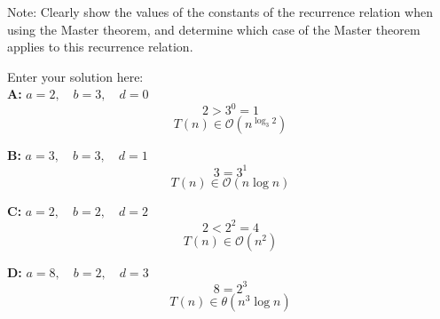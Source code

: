 \documentclass[10pt]{exam}
\begin{document}
\begin{questions}
Note: Clearly show the values of the constants of the recurrence relation when using the Master theorem, and determine which case of the Master theorem applies to this recurrence relation.


\begin{solution}
    Enter your solution here:\\
    \textbf{A:} $a = 2,\quad b = 3,\quad d = 0$
    \[2 > 3^0 = 1\]
    \[T(n) \in \mathcal{O}\!\left(n^{\log_3 2}\right)\]
    
    \textbf{B:} $a = 3,\quad b = 3,\quad d = 1$
    \[3 = 3^1\]
    \[T(n) \in \mathcal{O}(n \log n)\]
    
    \textbf{C:} $a = 2,\quad b = 2,\quad d = 2$
    \[2 < 2^2 = 4\]
    \[T(n) \in \mathcal{O}(n^2)\]
    
    \textbf{D:} $a = 8,\quad b = 2,\quad d = 3$
    \[8 = 2^3\]
    \[T(n) \in \theta(n^3 \log n)\]
\end{solution}

\end{questions}
\end{document}

